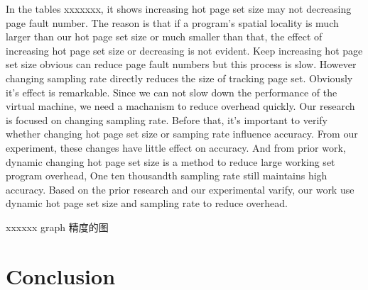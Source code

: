 \documentclass[10pt,twocolumn]{article}
\begin{document}
In the tables xxxxxxx, it shows increasing hot page set size may not decreasing page fault number. The reason is that if a program's spatial locality is much larger than our hot page set size or much smaller than that, the effect of increasing hot page set size or decreasing is not evident. Keep increasing hot page set size obvious can reduce page fault numbers but this process is slow. However changing sampling rate directly reduces the size of tracking page set. Obviously it's effect is remarkable. Since we can not slow down the performance of the virtual machine, we need a machanism to reduce overhead quickly. Our research is focused on changing sampling rate. Before that, it's important to verify whether changing hot page set size or samping rate influence accuracy. From our experiment, these changes have little effect on accuracy. And from prior work, dynamic changing hot page set size is a method to reduce large working set program overhead\cite{Wang2016Dynamic}, One ten thousandth sampling rate still maintains high accuracy\cite{aet}. Based on the prior research and our experimental varify, our work use dynamic hot page set size and sampling rate to reduce overhead.

xxxxxx graph 精度的图


\section{Conclusion}





\end{document}
